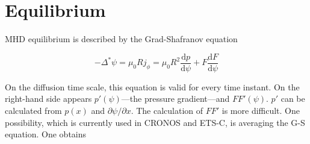 \section{Equilibrium}

MHD equilibrium is described by the Grad-Shafranov equation

\begin{equation}
-{\Delta ^*}\psi  =  {\mu _0}R{j_\phi } =  {\mu _0}{R^2}\frac{{{\text{d}}p}}{{{\text{d}}\psi }} + F\frac{{{\text{d}}F}}{{{\text{d}}\psi }}
\end{equation}

On the diffusion time scale, this equation is valid for every time instant. 
On the right-hand side appears $p'\left( \psi  \right)$---the pressure gradient---and 
$FF'\left( \psi  \right)$. $p'$ can be calculated from $p\left( x \right)$ and 
$\partial \psi /\partial x$. The calculation of $FF'$ is more difficult.
One possibility, which is currently used in CRONOS and ETS-C, is averaging the G-S
equation. One obtains

